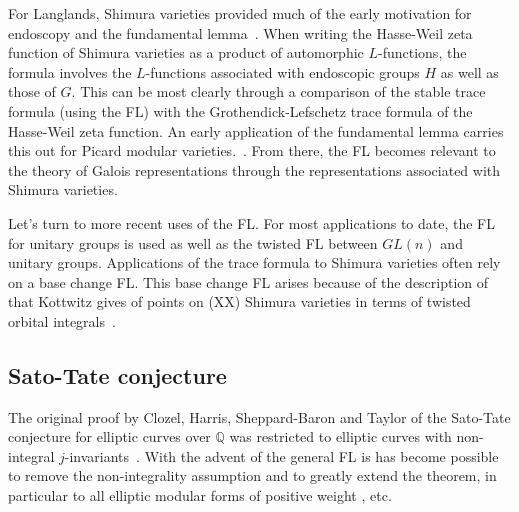 \documentclass[brochure,english,12pt]{bourbaki}
\newcommand{\ring}[1]{\mathbb{#1}}
\begin{document}
For Langlands, Shimura varieties provided much of the early motivation
for endoscopy and the fundamental lemma~\cite{}.  When writing the 
Hasse-Weil zeta function of Shimura varieties as a product of
automorphic $L$-functions, the formula involves the $L$-functions
associated with endoscopic groups $H$ as well as those of $G$.  This
can be most clearly through a comparison of the stable trace formula (using the FL)
with the Grothendick-Lefschetz trace formula of the Hasse-Weil zeta
function.
An early application of the fundamental lemma carries this out for
Picard modular
varieties.~\cite{Pic}.  From there, the FL becomes relevant to the theory of Galois representations
through the representations associated with Shimura varieties.

Let's turn to more recent uses of the FL.  
For most applications to
date, the FL for unitary groups is used as well as the twisted FL
between $GL(n)$ and unitary groups.  Applications of the trace formula
to Shimura varieties often rely on a base change FL.  This base change FL arises
because of the description of that Kottwitz gives of points on (XX)
Shimura varieties in terms of twisted orbital
integrals~\cite{Kottwitz}.





\subsection{Sato-Tate conjecture}

The original proof by Clozel, Harris, Sheppard-Baron and Taylor
of the Sato-Tate conjecture for elliptic curves over
$\ring{Q}$ was restricted to elliptic curves with non-integral
$j$-invariants~\cite{XX}.
With the advent of the general FL is has become possible to remove
the non-integrality assumption and to greatly extend the theorem, in particular 
to all elliptic modular forms of positive weight \cite{Barnet-Lamb}, etc.


\end{document}

